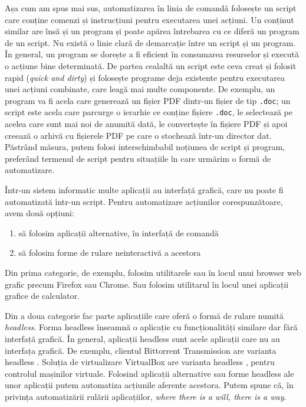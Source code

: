 Așa cum am spus mai sus, automatizarea în linia de comandă folosește un script care conține comenzi și instrucțiuni pentru executarea unei acțiuni.
Un conținut similar are însă și un program și poate apărea întrebarea cu ce diferă un program de un script.
Nu există o linie clară de demarcație între un script și un program.
În general, un program se dorește a fi eficient în consumarea resurselor și execută o acțiune bine determinată.
De partea cealaltă un script este ceva creat și folosit rapid (\textit{quick and dirty}) și folosește programe deja existente pentru executarea unei acțiuni combinate, care leagă mai multe componente.
De exemplu, un program va fi acela care generează un fișier PDF dintr-un fișier de tip \texttt{.doc}; un script este acela care parcurge o ierarhie ce conține fișiere \texttt{.doc}, le selectează pe acelea care sunt mai noi de anumită dată, le convertește în fișiere PDF și apoi creează o arhivă cu fișierele PDF pe care o stochează într-un director dat.
Păstrând măsura, putem folosi interschimbabil noțiunea de script și program, preferând termenul de script pentru situațiile în care urmărim o formă de automatizare.

Într-un sistem informatic multe aplicații au interfață grafică, care nu poate fi automatizată într-un script.
Pentru automatizare acțiunilor corespunzătoare, avem două opțiuni:
\begin{enumerate}
 \item să folosim aplicații alternative, în interfață de comandă
 \item să folosim forme de rulare neinteractivă a acestora
\end{enumerate}

Din prima categorie, de exemplu, folosim utilitarele  sau  în locul unui browser web grafic precum Firefox sau Chrome.
Sau folosim utilitarul  în locul unei aplicații grafice de calculator.

Din a doua categorie fac parte aplicațiile care oferă o formă de rulare numită \textit{headless}.
Forma headless înseamnă o aplicație cu funcționalități similare dar fără interfață grafică.
În general, aplicații headless sunt acele aplicații care nu au interfața grafică.
De exemplu, clientul Bittorrent Transmission are varianta headless .
Soluția de virtualizare VirtualBox are varianta headless , pentru controlul mașinilor virtuale.
Folosind aplicații alternative sau forme headless ale unor aplicații putem automatiza acțiunile aferente acestora.
Putem spune că, în privința automatizării rulării aplicațiilor, \textit{where there is a will, there is a way}.

